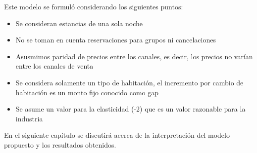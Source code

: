 Este modelo se formuló considerando los siguientes puntos:
\begin{itemize}[noitemsep]
  \item Se consideran estancias de una sola noche
  \item No se toman en cuenta reservaciones para grupos ni cancelaciones
  \item Asusmimos paridad de precios entre los canales, es decir, los precios no varían entre los canales de venta
  \item Se considera solamente un tipo de habitación, el incremento por cambio de habitación es un monto fijo conocido como gap
  \item Se asume un valor para la elasticidad (-2) que es un valor razonable para la industria
\end{itemize}

En el siguiente capítulo se discutirá acerca de la interpretación del modelo propuesto y los resultados obtenidos.
